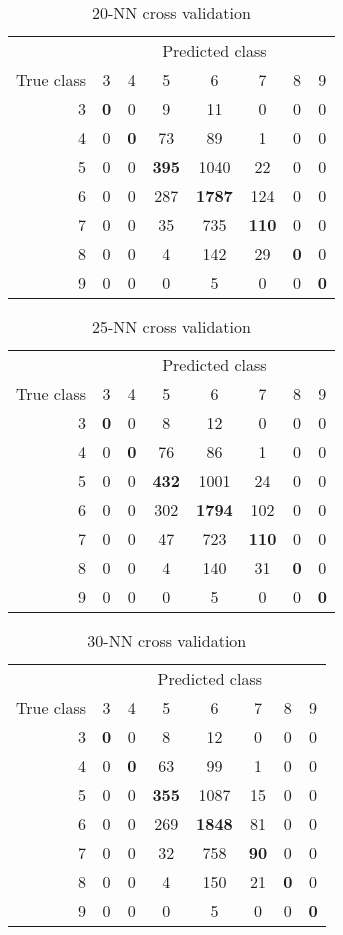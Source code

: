 \documentclass{report}
\begin{document}
\begin{table}
\centering
\begin{tabular}{r | *{7}{c}}
& \multicolumn{7}{c}{Predicted class} \\
True class & 3&4&5&6&7&8&9 \\
\hline
3 & \textbf{0}&0&9&11&0&0&0 \\
4 & 0&\textbf{0}&73&89&1&0&0 \\
5 & 0&0&\textbf{395}&1040&22&0&0 \\
6 & 0&0&287&\textbf{1787}&124&0&0 \\
7 & 0&0&35&735&\textbf{110}&0&0 \\
8 & 0&0&4&142&29&\textbf{0}&0 \\
9 & 0&0&0&5&0&0&\textbf{0} \\
\end{tabular}
\caption{20-NN cross validation}
\end{table}
\begin{table}
\centering
\begin{tabular}{r | *{7}{c}}
& \multicolumn{7}{c}{Predicted class} \\
True class & 3&4&5&6&7&8&9 \\
\hline
3 & \textbf{0}&0&8&12&0&0&0 \\
4 & 0&\textbf{0}&76&86&1&0&0 \\
5 & 0&0&\textbf{432}&1001&24&0&0 \\
6 & 0&0&302&\textbf{1794}&102&0&0 \\
7 & 0&0&47&723&\textbf{110}&0&0 \\
8 & 0&0&4&140&31&\textbf{0}&0 \\
9 & 0&0&0&5&0&0&\textbf{0} \\
\end{tabular}
\caption{25-NN cross validation}
\end{table}
\begin{table}
\centering
\begin{tabular}{r | *{7}{c}}
& \multicolumn{7}{c}{Predicted class} \\
True class & 3&4&5&6&7&8&9 \\
\hline
3 & \textbf{0}&0&8&12&0&0&0 \\
4 & 0&\textbf{0}&63&99&1&0&0 \\
5 & 0&0&\textbf{355}&1087&15&0&0 \\
6 & 0&0&269&\textbf{1848}&81&0&0 \\
7 & 0&0&32&758&\textbf{90}&0&0 \\
8 & 0&0&4&150&21&\textbf{0}&0 \\
9 & 0&0&0&5&0&0&\textbf{0} \\
\end{tabular}
\caption{30-NN cross validation}
\end{table}
\end{document}
